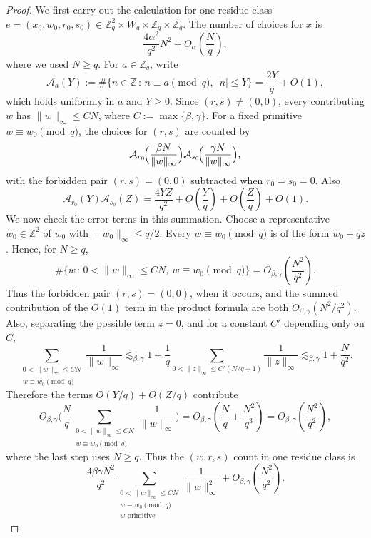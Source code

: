 \documentclass[11pt,reqno]{amsart}
\numberwithin{equation}{section}
\newcommand{\norm}[1]{\lVert #1\rVert_\infty}
\renewcommand{\le}{\leqslant}
\renewcommand{\ge}{\geqslant}
\begin{document}
\begin{proof}
We first carry out the calculation for one residue class
$e=(x_0,w_0,r_0,s_0)\in\mathbb{Z}_q^2\times W_q\times
\mathbb{Z}_q\times\mathbb{Z}_q$. The number of choices for $x$ is
\[ \frac{4\alpha^2}{q^2}N^2+O_{\alpha}\left(\frac{N}{q}\right), \]
where we used $N\ge q$. For $a\in\mathbb{Z}_q$, write
\[ \mathcal{A}_a(Y):=\#\{n\in\mathbb{Z} \,:\, n\equiv a\!\!\!\pmod q,
\ |n|\le Y\}=\frac{2Y}{q}+O(1), \]
which holds uniformly in $a$ and $Y\ge0$. Since $(r,s)\ne(0,0)$, every contributing $w$ has $\norm{w}\le CN$, where $C:=\max\{\beta,\gamma\}$. For a fixed primitive $w\equiv w_0\pmod q$, the choices for $(r,s)$ are counted by
\[ \mathcal{A}_{r_0}\!\Bigl(\frac{\beta N}{\norm{w}}\Bigr)
\mathcal{A}_{s_0}\!\Bigl(\frac{\gamma N}{\norm{w}}\Bigr), \]
with the forbidden pair $(r,s)=(0,0)$ subtracted when $r_0=s_0=0$. Also
\[ \mathcal{A}_{r_0}(Y)\mathcal{A}_{s_0}(Z)
=\frac{4YZ}{q^2}+O\left(\frac{Y}{q}\right)+O\left(\frac{Z}{q}\right)+O(1). \]
We now check the error terms in this summation. Choose a representative $\widetilde w_0\in\mathbb{Z}^2$ of $w_0$ with $\norm{\widetilde w_0}\le q/2$. Every $w\equiv w_0\pmod q$ is of the form $\widetilde w_0+qz$. Hence, for $N\ge q$,
\[ \#\{w \,:\, 0<\norm{w}\le CN,\ w\equiv w_0\!\!\!\pmod q\}=O_{\beta,\gamma}\left(\frac{N^2}{q^2}\right). \]
Thus the forbidden pair $(r,s)=(0,0)$, when it occurs, and the summed contribution of the $O(1)$ term in the product formula are both $O_{\beta,\gamma}(N^2/q^2)$. Also, separating the possible term $z=0$, and for a constant $C'$ depending only on $C$,
\[ \sum_{\substack{0<\norm{w}\le CN\\ w\equiv w_0\!\!\!\pmod q}}\frac1{\norm{w}}
\lesssim_{\beta,\gamma} 1 + \frac1q\sum_{0<\norm{z}\le C'(N/q+1)}\frac1{\norm{z}}
\lesssim_{\beta,\gamma} 1 + \frac{N}{q^2}. \]
Therefore the terms $O(Y/q)+O(Z/q)$ contribute
\[ O_{\beta,\gamma}\biggl(\frac Nq \sum_{\substack{0<\norm{w}\le CN\\ w\equiv w_0\!\!\!\pmod q}}\frac1{\norm{w}}\biggr)
=O_{\beta,\gamma}\left(\frac Nq+\frac{N^2}{q^3}\right)
=O_{\beta,\gamma}\left(\frac{N^2}{q^2}\right), \]
where the last step uses $N\ge q$.
Thus the $(w,r,s)$ count in one residue class is
\begin{equation}\label{eq:wrsmain}
\frac{4\beta\gamma N^2}{q^2}
\sum_{\substack{0<\norm{w}\le CN\\ w\equiv w_0 \!\!\!\pmod q\\ w\text{ primitive}}} \frac1{\norm{w}^2} + O_{\beta,\gamma}\left(\frac{N^2}{q^2}\right).
\end{equation}


\end{proof}
\end{document}
